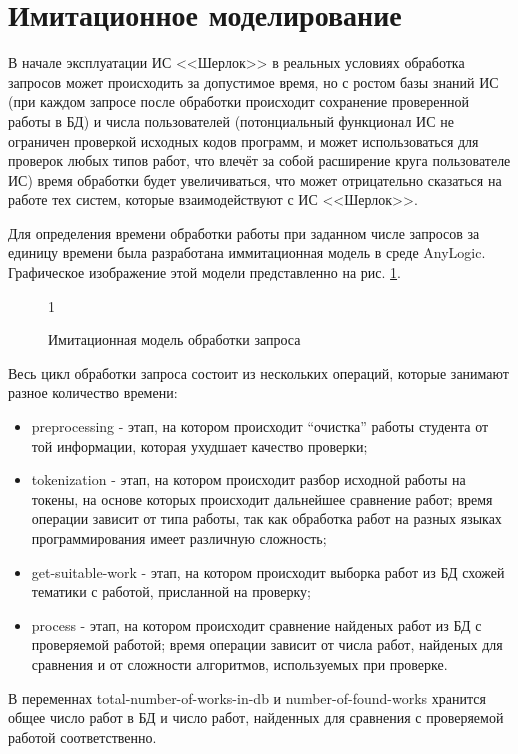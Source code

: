 \section{Имитационное моделирование}

	В начале эксплуатации ИС <<Шерлок>> в реальных условиях обработка запросов может происходить за допустимое время, но с ростом базы знаний ИС (при каждом запросе после обработки происходит сохранение проверенной работы в БД) и числа пользователей (потонциальный функционал ИС не ограничен проверкой исходных кодов программ, и может использоваться для проверок любых типов работ, что влечёт за собой расширение круга пользователе ИС) время обработки будет увеличиваться, что может отрицательно сказаться на работе тех систем, которые взаимодействуют с ИС <<Шерлок>>.

	Для определения времени обработки работы при заданном числе запросов за единицу времени была разработана иммитационная модель в среде AnyLogic. Графическое изображение этой модели представленно на рис. \ref{img:simulation_model}.

	\begin{figure}[h]
		1
		\caption{Имитационная модель обработки запроса}
		\label{img:simulation_model}
	\end{figure}

	Весь цикл обработки запроса состоит из нескольких операций, которые занимают разное количество времени:
	\begin{itemize}
		\item preprocessing - этап, на котором происходит ``очистка'' работы студента от той информации, которая ухудшает качество проверки;
		\item tokenization - этап, на котором происходит разбор исходной работы на токены, на основе которых происходит дальнейшее сравнение работ; время операции зависит от типа работы, так как обработка работ на разных языках программирования имеет различную сложность;
		\item get-suitable-work - этап, на котором происходит выборка работ из БД схожей тематики с работой, присланной на проверку;
		\item process - этап, на котором происходит сравнение найденых работ из БД с проверяемой работой; время операции зависит от числа работ, найденых для сравнения и от сложности алгоритмов, используемых при проверке.
	\end{itemize}

	В переменнах total-number-of-works-in-db и number-of-found-works хранится общее число работ в БД и число работ, найденных для сравнения с проверяемой работой соответственно.


